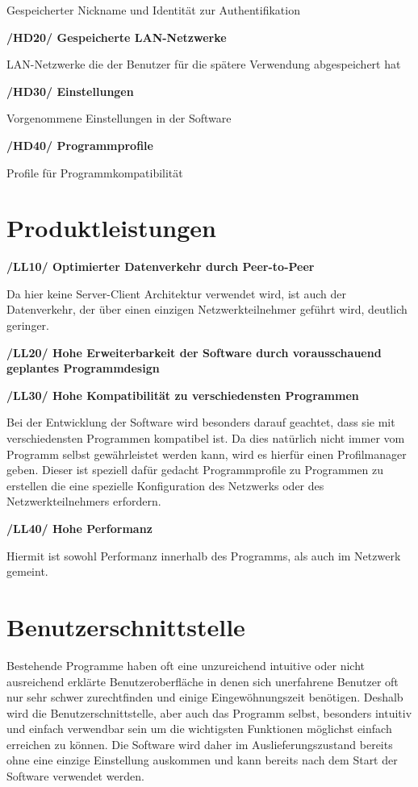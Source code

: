 \documentclass[a4paper,12pt]{scrreprt}
\begin{document}
	Gespeicherter Nickname und Identität zur Authentifikation
	
	\textbf{/HD20/ Gespeicherte LAN-Netzwerke}
	
	LAN-Netzwerke die der Benutzer für die spätere Verwendung abgespeichert hat
	
	\textbf{/HD30/ Einstellungen}
	
	Vorgenommene Einstellungen in der Software
	
	\textbf{/HD40/ Programmprofile}
	
	Profile für Programmkompatibilität

\chapter{Produktleistungen}
\textbf{/LL10/ Optimierter Datenverkehr durch Peer-to-Peer}
	
	Da hier keine Server-Client Architektur verwendet wird, ist auch der Datenverkehr, der über einen einzigen Netzwerkteilnehmer geführt wird, deutlich geringer.
	
\textbf{/LL20/ Hohe Erweiterbarkeit der Software durch vorausschauend geplantes Programmdesign}
	
\textbf{/LL30/ Hohe Kompatibilität zu verschiedensten Programmen}
	
	Bei der Entwicklung der Software wird besonders darauf geachtet, dass sie mit verschiedensten Programmen kompatibel ist. Da dies natürlich nicht immer vom Programm selbst gewährleistet werden kann, wird es hierfür einen Profilmanager geben. Dieser ist speziell dafür gedacht Programmprofile zu Programmen zu erstellen die eine spezielle Konfiguration des Netzwerks oder des Netzwerkteilnehmers erfordern.
	
\textbf{/LL40/ Hohe Performanz}
	
	Hiermit ist sowohl Performanz innerhalb des Programms, als auch im Netzwerk gemeint.
	
	
	
	
\chapter{Benutzerschnittstelle}
	Bestehende Programme haben oft eine unzureichend intuitive oder nicht ausreichend erklärte Benutzeroberfläche in denen sich unerfahrene Benutzer oft nur sehr schwer zurechtfinden und einige Eingewöhnungszeit benötigen. Deshalb wird die Benutzerschnittstelle, aber auch das Programm selbst, besonders intuitiv und einfach verwendbar sein um die wichtigsten Funktionen möglichst einfach erreichen zu können. Die Software wird daher im Auslieferungszustand bereits ohne eine einzige Einstellung auskommen und kann bereits nach dem Start der Software verwendet werden.
	
\end{document}
